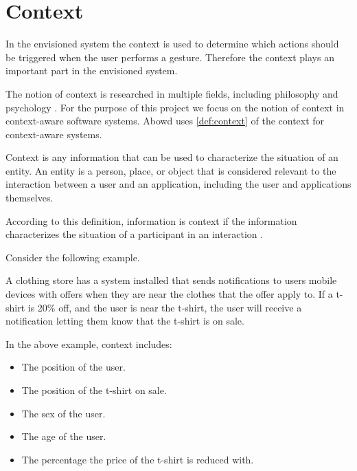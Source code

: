 \section{Context}
\label{sec:analysis:context}

In the envisioned system the context is used to determine which actions should be triggered when the user performs a gesture. Therefore the context plays an important part in the envisioned system.

The notion of context is researched in multiple fields, including philosophy and psychology \cite{bolchini2007data}. For the purpose of this project we focus on the notion of context in context-aware software systems. Abowd \etal\cite{abowd1999towards} uses \cref{def:context} of the context for context-aware systems.

\begin{definition}
\label{def:context}
Context is any information that can be used to characterize the situation of an entity. An entity is a person, place, or object that is considered relevant to the interaction between a user and an application, including the user and applications themselves.
\end{definition}

According to this definition, information is context if the information characterizes the situation of a participant in an interaction \cite{abowd1999towards}.

Consider the following example.

\begin{testexample}
A clothing store has a system installed that sends notifications to users mobile devices with offers when they are near the clothes that the offer apply to. If a t-shirt is 20\% off, and the user is near the t-shirt, the user will receive a notification letting them know that the t-shirt is on sale.
\end{testexample}

In the above example, context includes:

\begin{itemize}
\item The position of the user.
\item The position of the t-shirt on sale.
\item The sex of the user.
\item The age of the user.
\item The percentage the price of the t-shirt is reduced with.
\end{itemize}

